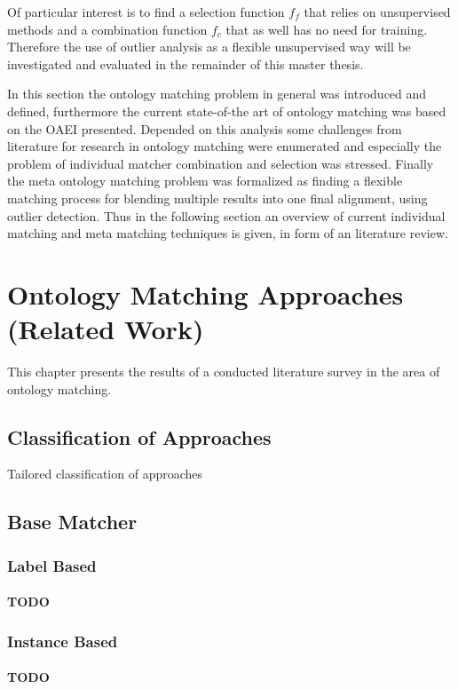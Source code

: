 \documentclass[11pt,titlepage,oneside,openany,a4paper]{report}
\begin{document}
Of particular interest is to find a selection function $f_f$ that relies on unsupervised methods and a combination function $f_c$ that as well has no need for training. Therefore the use of  outlier analysis as a flexible unsupervised way will be investigated and evaluated in the remainder of this master thesis.

In this section the ontology matching problem in general was introduced and defined, furthermore the current state-of-the art of ontology matching was based on the OAEI presented. Depended on this analysis some challenges from literature for research in ontology matching were enumerated and especially the problem of individual matcher combination and selection was stressed. Finally the meta ontology matching problem was formalized as finding a flexible matching process for blending multiple results into one final alignment, using outlier detection.  Thus in the following section an overview of current individual matching and meta matching techniques is given, in form of an literature review.
\chapter{Ontology Matching Approaches (Related Work)}
This chapter presents the results of a conducted literature survey in the area of ontology matching.
\section{Classification of Approaches}
Tailored classification of approaches
\section{Base Matcher}

\subsection{Label Based}
 \subsubsection{TODO}
\subsection{Instance Based}
 \subsubsection{TODO}
\end{document}
